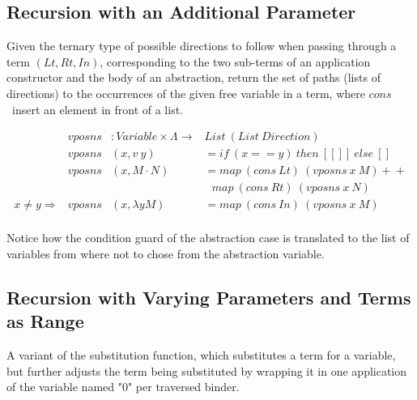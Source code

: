 \documentclass{article}
\begin{document}
\hspace{5px}

 \hspace{5px}

\subsection{Recursion with an Additional Parameter}

Given the ternary type of possible directions to follow when passing through a term $({Lt, Rt, In})$, corresponding to the two sub-terms of an application constructor and the body of an abstraction, return the set of paths (lists of directions) to the occurrences of the given free variable in a term, where $cons$\ insert an element in front of a list.

\[
\begin{array}{rrll}
&vposns &: Variable \times \Lambda \rightarrow & List\ (List\ Direction) \\
&vposns &(x , v\ y)         &= if\ (x == y)\ then\ [[]]\ else\ []   \\
&vposns &(x , M \cdot N)    &= map\ (cons\ Lt)\ (vposns\ x\ M) +\!\!+  \\
& & &\ \ \ map\ (cons\ Rt)\ (vposns\ x\ N) \\
x \neq y \Rightarrow&vposns &(x ,\lambda y M)   &= map\ (cons\ In)\ (vposns\ x\ M) \\
\end{array} \]

Notice how the condition guard of the abstraction case is translated to the list of variables from where not to chose from the abstraction variable.

 \hspace{5px}

\subsection{Recursion with Varying Parameters and Terms as Range}

A variant of the substitution function, which substitutes a term for a variable, but further adjusts the term being substituted by wrapping it in one application of the variable named "0" per traversed binder.
\end{document}
